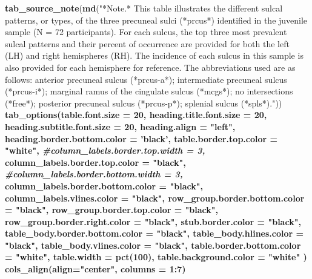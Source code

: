 \documentclass[
]{article}
\newenvironment{Shaded}{\begin{snugshade}}{\end{snugshade}}
\newcommand{\CommentTok}[1]{\textcolor[rgb]{0.56,0.35,0.01}{\textit{#1}}}
\newcommand{\DataTypeTok}[1]{\textcolor[rgb]{0.13,0.29,0.53}{#1}}
\newcommand{\DecValTok}[1]{\textcolor[rgb]{0.00,0.00,0.81}{#1}}
\newcommand{\KeywordTok}[1]{\textcolor[rgb]{0.13,0.29,0.53}{\textbf{#1}}}
\newcommand{\NormalTok}[1]{#1}
\newcommand{\OperatorTok}[1]{\textcolor[rgb]{0.81,0.36,0.00}{\textbf{#1}}}
\newcommand{\StringTok}[1]{\textcolor[rgb]{0.31,0.60,0.02}{#1}}
\begin{document}
\begin{Shaded}
\begin{Highlighting}[]
{{{{{{{{{\KeywordTok{tab_source_note}\NormalTok{(}\KeywordTok{md}\NormalTok{(}\StringTok{"*Note.* This table illustrates the different sulcal patterns, or types, of the three precuneal sulci (*prcus*) identified in the juvenile sample (N = 72 participants). For each sulcus, the top three most prevalent sulcal patterns and their percent of occurrence are provided for both the left (LH) and right hemispheres (RH). The incidence of each sulcus in this sample is also provided for each hemisphere for reference. The abbreviations used are as follows: anterior precuneal sulcus (*prcus-a*); intermediate precuneal sulcus (*prcus-i*); marginal ramus of the cingulate sulcus (*mcgs*); no intersections (*free*); posterior precuneal sulcus (*prcus-p*); splenial sulcus (*spls*)."}\NormalTok{)) }\OperatorTok{%>%}
\StringTok{  }\KeywordTok{tab_options}\NormalTok{(}\DataTypeTok{table.font.size =} \DecValTok{20}\NormalTok{,}
    \DataTypeTok{heading.title.font.size =} \DecValTok{20}\NormalTok{,}
    \DataTypeTok{heading.subtitle.font.size =} \DecValTok{20}\NormalTok{,}
    \DataTypeTok{heading.align =} \StringTok{"left"}\NormalTok{,}
    \DataTypeTok{heading.border.bottom.color =} \StringTok{'black'}\NormalTok{,}
    \DataTypeTok{table.border.top.color =} \StringTok{"white"}\NormalTok{,}
    \CommentTok{#column_labels.border.top.width = 3,}
    \DataTypeTok{column_labels.border.top.color =} \StringTok{"black"}\NormalTok{,}
    \CommentTok{#column_labels.border.bottom.width = 3,}
    \DataTypeTok{column_labels.border.bottom.color =} \StringTok{"black"}\NormalTok{,}
    \DataTypeTok{column_labels.vlines.color =} \StringTok{"black"}\NormalTok{,}
    \DataTypeTok{row_group.border.bottom.color =} \StringTok{"black"}\NormalTok{,}
    \DataTypeTok{row_group.border.top.color =} \StringTok{"black"}\NormalTok{,}
    \DataTypeTok{row_group.border.right.color =} \StringTok{"black"}\NormalTok{,}
    \DataTypeTok{stub.border.color =} \StringTok{"black"}\NormalTok{,}
    \DataTypeTok{table_body.border.bottom.color =} \StringTok{"black"}\NormalTok{,}
    \DataTypeTok{table_body.hlines.color =} \StringTok{"black"}\NormalTok{,}
    \DataTypeTok{table_body.vlines.color =} \StringTok{"black"}\NormalTok{,}
    \DataTypeTok{table.border.bottom.color =} \StringTok{"white"}\NormalTok{,}
    \DataTypeTok{table.width =} \KeywordTok{pct}\NormalTok{(}\DecValTok{100}\NormalTok{),}
    \DataTypeTok{table.background.color =} \StringTok{"white"}
\NormalTok{  ) }\OperatorTok{%>%}
\StringTok{  }\KeywordTok{cols_align}\NormalTok{(}\DataTypeTok{align=}\StringTok{"center"}\NormalTok{, }\DataTypeTok{columns =} \DecValTok{1}\OperatorTok{:}\DecValTok{7}\NormalTok{) }\OperatorTok{%>%}
}}}}}}}}}}}}
\end{Highlighting}
\end{Shaded}
\end{document}
